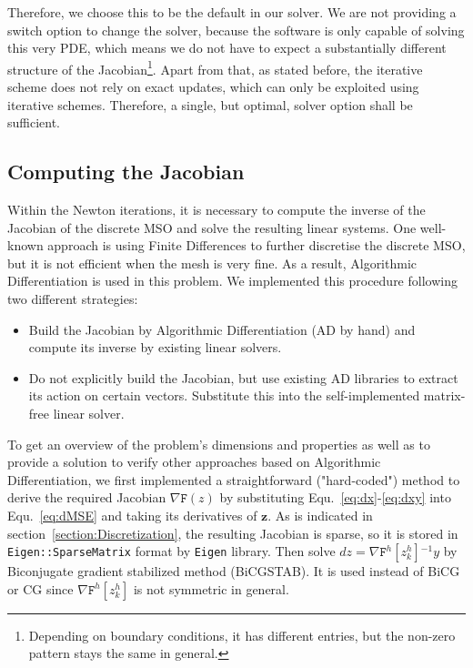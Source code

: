 \documentclass[11pt]{scrartcl}
\newcommand{\mSurfDisc}[1]{\ensuremath{\mathtt{F}^h\left[#1\right]}}
\newcommand{\inv}{\ensuremath{^{-1}}}
\newcommand{\vect}[1]{\boldsymbol{#1}}
\begin{document}
Therefore, we choose this to be the default in our solver. We are not providing a switch option to change the solver, because the software is only capable of solving this very PDE, which means we do not have to expect a substantially different structure of the Jacobian\footnote{Depending on boundary conditions, it has different entries, but the non-zero pattern stays the same in general.}. Apart from that, as stated before, the iterative scheme does not rely on exact updates, which can only be exploited using iterative schemes. Therefore, a single, but optimal, solver option shall be sufficient. 


\subsection{Computing the Jacobian}
Within the Newton iterations, it is necessary to compute the inverse of the Jacobian of the discrete MSO and solve the resulting linear systems. One well-known approach is using Finite Differences to further discretise the discrete MSO, but it is not efficient when the mesh is very fine. As a result, Algorithmic Differentiation is used in this problem. We implemented this procedure following two different strategies:
\begin{itemize}
	\item Build the Jacobian by Algorithmic Differentiation (AD by hand) and compute its inverse by existing linear solvers.
	\item Do not explicitly build the Jacobian, but use existing AD libraries to extract its action on certain vectors. Substitute this into the self-implemented matrix-free linear solver.
\end{itemize}
To get an overview of the problem's dimensions and properties as well as to provide a solution to verify other approaches based on Algorithmic Differentiation, we first implemented a straightforward ("hard-coded") method to derive the required Jacobian $\nabla \mathtt{F}(z)$ by substituting Equ.~\eqref{eq:dx}-\eqref{eq:dxy} into Equ.~\eqref{eq:dMSE} and taking its derivatives of $\vect{z}$. As is indicated in section~\ref{section:Discretization}, the resulting Jacobian is sparse, so it is stored in \texttt{Eigen::SparseMatrix} format by \texttt{Eigen} library. Then solve $dz = \nabla\mSurfDisc{z^h_k}\inv y$ by Biconjugate gradient stabilized method (BiCGSTAB). It is used instead of BiCG or CG since $\nabla\mSurfDisc{z^h_k}$ is not symmetric in general.
\end{document}
